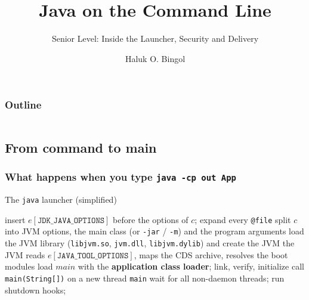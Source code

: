 \documentclass[aspectratio=169,10pt,compress]{beamer}
\title{Java on the Command Line}
\subtitle{Senior Level: Inside the Launcher, Security and Delivery}
\author[Bingol]{Haluk O. Bingol}
\institute[FCIS]{
    Faculty of Computer and Information Sciences\\
    Yeditepe University
}
\date{
	{\tiny \hbTimeStamp}
}
\begin{document}
\begin{frame}[t,fragile]
  \titlepage
\end{frame}




\begin{frame}[t,fragile] \frametitle{Outline}
  \begin{columns}[T]
    \begin{column}{0.48\textwidth}
      \tableofcontents[sections={1-4}, hideallsubsections]
    \end{column}
    \begin{column}{0.48\textwidth}
      \tableofcontents[sections={5-8}, hideallsubsections]
    \end{column}
  \end{columns}
\end{frame}


\subsection[Steps]{From command to main}




\begin{frame}[t,fragile] \frametitle{What happens when you type \texttt{java -cp out App}}
\begin{algorithm}[H]
  \caption{The \texttt{java} launcher (simplified)}
  insert $e[\texttt{JDK\_JAVA\_OPTIONS}]$ before the options of $c$; expand every \texttt{@file}\;
  split $c$ into JVM options, the main class (or \texttt{-jar} / \texttt{-m}) and the program arguments\;
  load the JVM library (\texttt{libjvm.so}, \texttt{jvm.dll}, \texttt{libjvm.dylib}) and create the JVM\;
  the JVM reads $e[\texttt{JAVA\_TOOL\_OPTIONS}]$, maps the CDS archive, resolves the boot modules\;
  load $\mathit{main}$ with the \textbf{application class loader}; link, verify, initialize\;
  call \texttt{main(String[])} on a new thread \texttt{main}\;
  wait for all non-daemon threads; run shutdown hooks; \;
\end{algorithm}

\end{frame}
\end{document}
